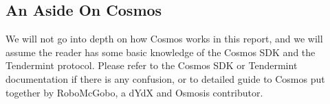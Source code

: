    \subsection{An Aside On Cosmos}
        
        We will not go into depth on how Cosmos works in this report, and we will assume the reader has some basic knowledge of the Cosmos SDK and the Tendermint protocol. Please refer to the Cosmos SDK or Tendermint documentation if there is any confusion, or to  detailed guide to Cosmos put together by RoboMcGobo, a dYdX and Osmosis contributor.





